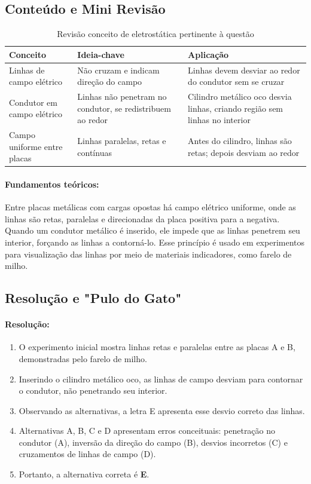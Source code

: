 \documentclass{article}
\begin{document}
\subsection*{Conteúdo e Mini Revisão}
\begin{table}[h!]
\centering
\begin{tabular}{|p{4cm}|p{5cm}|p{6cm}|}
\hline
\textbf{Conceito} & \textbf{Ideia-chave} & \textbf{Aplicação} \\
\hline
Linhas de campo elétrico & Não cruzam e indicam direção do campo & Linhas devem desviar ao redor do condutor sem se cruzar \\
\hline
Condutor em campo elétrico & Linhas não penetram no condutor, se redistribuem ao redor & Cilindro metálico oco desvia linhas, criando região sem linhas no interior \\
\hline
Campo uniforme entre placas & Linhas paralelas, retas e contínuas & Antes do cilindro, linhas são retas; depois desviam ao redor \\
\hline
\end{tabular}
\caption{Revisão conceito de eletrostática pertinente à questão}
\end{table}

\paragraph{Fundamentos teóricos:}
Entre placas metálicas com cargas opostas há campo elétrico uniforme, onde as linhas são retas, paralelas e direcionadas da placa positiva para a negativa. Quando um condutor metálico é inserido, ele impede que as linhas penetrem seu interior, forçando as linhas a contorná-lo. Esse princípio é usado em experimentos para visualização das linhas por meio de materiais indicadores, como farelo de milho.

\subsection*{Resolução e "Pulo do Gato"}
\paragraph{Resolução:}
\begin{enumerate}
  \item O experimento inicial mostra linhas retas e paralelas entre as placas A e B, demonstradas pelo farelo de milho.
  \item Inserindo o cilindro metálico oco, as linhas de campo desviam para contornar o condutor, não penetrando seu interior.
  \item Observando as alternativas, a letra E apresenta esse desvio correto das linhas.
  \item Alternativas A, B, C e D apresentam erros conceituais: penetração no condutor (A), inversão da direção do campo (B), desvios incorretos (C) e cruzamentos de linhas de campo (D).
  \item Portanto, a alternativa correta é \textbf{E}.
\end{enumerate}
\end{document}

